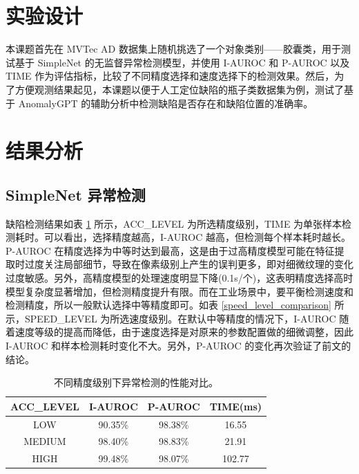 \documentclass[
  ]{njuthesis}
\begin{document}
\section{实验设计}

本课题首先在 MVTec AD 数据集上随机挑选了一个对象类别——胶囊类，用于测试基于 SimpleNet 的无监督异常检测模型，并使用 I-AUROC 和 P-AUROC 以及 TIME 作为评估指标，比较了不同精度选择和速度选择下的检测效果。然后，为了方便观测结果起见，本课题以便于人工定位缺陷的瓶子类数据集为例，测试了基于 AnomalyGPT 的辅助分析中检测缺陷是否存在和缺陷位置的准确率。

\section{结果分析}

\subsection{SimpleNet 异常检测}

缺陷检测结果如表 \ref{acc_level_comparison} 所示，ACC\_LEVEL 为所选精度级别，TIME 为单张样本检测耗时。可以看出，选择精度越高，I-AUROC 越高，但检测每个样本耗时越长。P-AUROC 在精度选择为中等时达到最高，这是由于过高精度模型可能在特征提取时过度关注局部细节，导致在像素级别上产生的误判更多，即对细微纹理的变化过度敏感。另外，高精度模型的处理速度明显下降(0.1s/个)，这表明精度选择高时模型复杂度显著增加，但检测精度提升有限。而在工业场景中，要平衡检测速度和检测精度，所以一般默认选择中等精度即可。如表 \ref{speed_level_comparison} 所示，SPEED\_LEVEL 为所选速度级别。在默认中等精度的情况下，I-AUROC 随着速度等级的提高而降低，由于速度选择是对原来的参数配置做的细微调整，因此 I-AUROC 和样本检测耗时变化不大。另外，P-AUROC 的变化再次验证了前文的结论。

\begin{table}[H]
    \centering
    \caption{不同精度级别下异常检测的性能对比。}
    \label{acc_level_comparison}
    \renewcommand\arraystretch{0.5}
    \begin{tabular}{c|c|c|c}
    \toprule[1.5pt]
    ACC\_LEVEL & I-AUROC & P-AUROC & TIME(ms) \\
    \midrule[1pt]
    LOW & 90.35\% & 98.38\% & 16.55 \\
    \midrule[0.5pt]
    MEDIUM & 98.40\% & 98.83\% & 21.91 \\
    \midrule[0.5pt]
    HIGH & 99.48\% & 98.07\% & 102.77 \\
    \bottomrule[1.5pt]
    \end{tabular}
\end{table}
\end{document}
